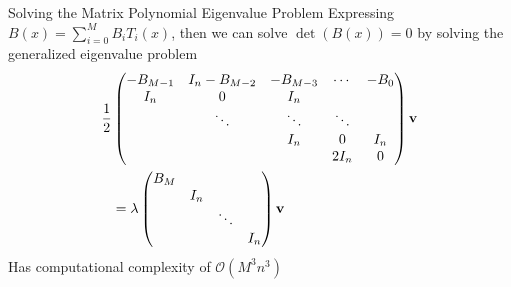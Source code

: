 \documentclass[xcolor={rgb,dvipsnames}]{beamer}		%
\begin{document}
\begin{frame}{Solving the Matrix Polynomial Eigenvalue Problem\footnotemark[1]}															%
Expressing $B(x) = \sum_{i=0}^{M}B_iT_i(x)$, then we can solve $\det\left(B(x)\right)=0$ by solving the generalized eigenvalue problem
\begin{align*}
\frac{1}{2}&\begin{pmatrix}
-B_{M-1} 	& I_n-B_{M-2} 	& -B_{M-3} 	& \cdots 	& -B_0	\\
I_n	       	& 0		     	& I_n	       		&	    	&		\\
		& \ddots		& \ddots		& \ddots	&		\\
		&			& I_n			& 0		& I_n		\\
		&			&			& 2I_n	& 0
\end{pmatrix}{\bf v}\\
&=\lambda\begin{pmatrix}
B_M	&	&		&	\\
	&I_n	&		&	\\
	&	&\ddots	&	\\
	&	&		&I_n \\
\end{pmatrix}{\bf v}
\end{align*}
Has computational complexity of $\mathcal{O}\left(M^3n^3\right)$	%
\end{frame}
\end{document}
